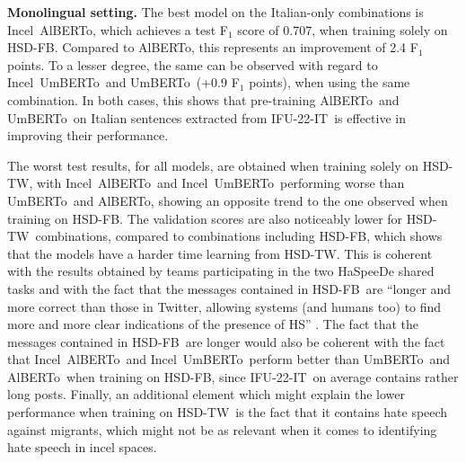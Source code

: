 \documentclass[11pt]{article}
\newcommand{\dsITcorpus}{IFU-22-IT}
\newcommand{\dsITclassification}{IFS-IT}
\newcommand{\umbert}{\mbox{UmBERTo}}
\newcommand{\albert}{\mbox{AlBERTo}}
\newcommand{\iumbert}{\mbox{Incel UmBERTo}}
\newcommand{\ialbert}{\mbox{Incel AlBERTo}}
\newcommand{\hsdfb}{\mbox{HSD-FB}}
\newcommand{\hsdtw}{\mbox{HSD-TW}}
\begin{document}
\vspace*{1mm}\noindent\textbf{Monolingual setting.}
The best model on the Italian-only combinations is \ialbert, which achieves a test F$_1$ score of 0.707, when training solely on \hsdfb. Compared to \albert, this represents an improvement of 2.4 F$_1$ points. To a lesser degree, the same can be observed with regard to \iumbert\, and \umbert\, (+0.9 F$_1$ points), when using the same combination. In both cases, this shows that pre-training \albert\, and \umbert\, on Italian sentences extracted from \dsITcorpus\, is effective in improving their performance.

The worst test results, for all models, are obtained when training solely on \hsdtw, with \ialbert\, and \iumbert\, performing worse than \umbert\, and \albert, showing an opposite trend to the one observed when training on \hsdfb.
The validation scores are also noticeably lower for \hsdtw\, combinations, compared to combinations including \hsdfb, which shows that the models have a harder time learning from \hsdtw. This is coherent with the results obtained by teams participating in the two HaSpeeDe shared tasks \cite{boscoOverviewEVALITA2018,basileEVALITA2020Overview} and with the fact that the messages contained in \hsdfb\, are ``longer and more correct than those in Twitter, allowing systems (and humans too) to find more and more clear indications of the presence of HS'' \cite{boscoOverviewEVALITA2018}. 
The fact that the messages contained in \hsdfb\, are longer would also be coherent with the fact that \ialbert\, and \iumbert\, perform better than \umbert\, and \albert\, when training on \hsdfb, since \dsITcorpus\, on average contains rather long posts.
Finally, an additional element which might explain the lower performance when training on \hsdtw\, is the fact that it contains hate speech against migrants, which might not be as relevant when it comes to identifying hate speech in incel spaces.
\end{document}
